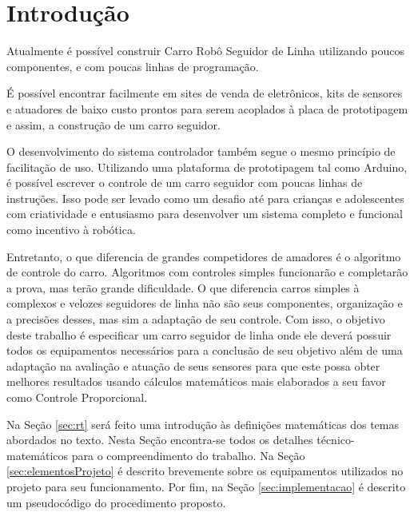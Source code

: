 \documentclass[portugues, brazil, a4paper,12pt]{article}
\begin{document}

\section{Introdução}
	Atualmente é possível construir Carro Robô Seguidor de Linha utilizando poucos componentes, e com poucas linhas de programação.
	
	É possível encontrar facilmente em sites de venda de eletrônicos, kits de sensores e atuadores de baixo custo prontos para serem acoplados à placa de prototipagem e assim, a construção de um carro seguidor.
	
	O desenvolvimento do sistema controlador também segue o mesmo princípio de facilitação de uso. Utilizando uma plataforma de prototipagem tal como Arduino, é possível escrever o controle de um carro seguidor com poucas linhas de instruções. Isso pode ser levado como um desafio até para crianças e adolescentes com criatividade e entusiasmo para desenvolver um sistema completo e funcional como incentivo à robótica.
	
	Entretanto, o que diferencia de grandes competidores de amadores é o algoritmo de controle do carro. Algoritmos com controles simples funcionarão e completarão a prova, mas terão grande dificuldade. O que diferencia carros simples à complexos e velozes seguidores de linha não são seus componentes, organização e a precisões desses, mas sim a adaptação de seu controle. Com isso, o objetivo deste trabalho é especificar um carro seguidor de linha onde ele deverá possuir todos os equipamentos necessários para a conclusão de seu objetivo além de uma adaptação na avaliação e atuação de seus sensores para que este possa obter melhores resultados usando cálculos matemáticos mais elaborados a seu favor como Controle Proporcional.
	
	Na Seção \ref{sec:rt} será feito uma introdução às definições matemáticas dos temas abordados no texto. Nesta Seção encontra-se todos os detalhes técnico-matemáticos para o compreendimento do trabalho. Na Seção \ref{sec:elementosProjeto} é descrito brevemente sobre os equipamentos utilizados no projeto para seu funcionamento. Por fim, na Seção \ref{sec:implementacao} é descrito um pseudocódigo do procedimento proposto.
\end{document}
